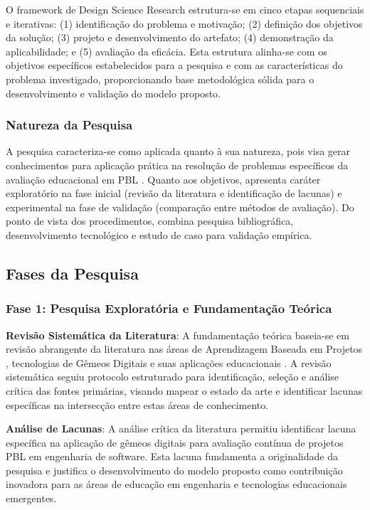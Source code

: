 \documentclass[12pt,a4paper]{article}
\begin{document}
O framework de Design Science Research estrutura-se em cinco etapas sequenciais e iterativas: (1) identificação do problema e motivação; (2) definição dos objetivos da solução; (3) projeto e desenvolvimento do artefato; (4) demonstração da aplicabilidade; e (5) avaliação da eficácia. Esta estrutura alinha-se com os objetivos específicos estabelecidos para a pesquisa e com as características do problema investigado, proporcionando base metodológica sólida para o desenvolvimento e validação do modelo proposto.

\subsubsection{Natureza da Pesquisa}

A pesquisa caracteriza-se como aplicada quanto à sua natureza, pois visa gerar conhecimentos para aplicação prática na resolução de problemas específicos da avaliação educacional em PBL \cite{gil91}. Quanto aos objetivos, apresenta caráter exploratório na fase inicial (revisão da literatura e identificação de lacunas) e experimental na fase de validação (comparação entre métodos de avaliação). Do ponto de vista dos procedimentos, combina pesquisa bibliográfica, desenvolvimento tecnológico e estudo de caso para validação empírica.

\subsection{Fases da Pesquisa}

\subsubsection{Fase 1: Pesquisa Exploratória e Fundamentação Teórica}

\textbf{Revisão Sistemática da Literatura}: A fundamentação teórica baseia-se em revisão abrangente da literatura nas áreas de Aprendizagem Baseada em Projetos \cite{thomas2000, savery2015, hmelo2004}, tecnologias de Gêmeos Digitais \cite{grieves2014, tao2018, barricelli2019} e suas aplicações educacionais \cite{bachmann2023, silveira2024panorama}. A revisão sistemática seguiu protocolo estruturado para identificação, seleção e análise crítica das fontes primárias, visando mapear o estado da arte e identificar lacunas específicas na intersecção entre estas áreas de conhecimento.

\textbf{Análise de Lacunas}: A análise crítica da literatura permitiu identificar lacuna específica na aplicação de gêmeos digitais para avaliação contínua de projetos PBL em engenharia de software. Esta lacuna fundamenta a originalidade da pesquisa e justifica o desenvolvimento do modelo proposto como contribuição inovadora para as áreas de educação em engenharia e tecnologias educacionais emergentes.
\end{document}
